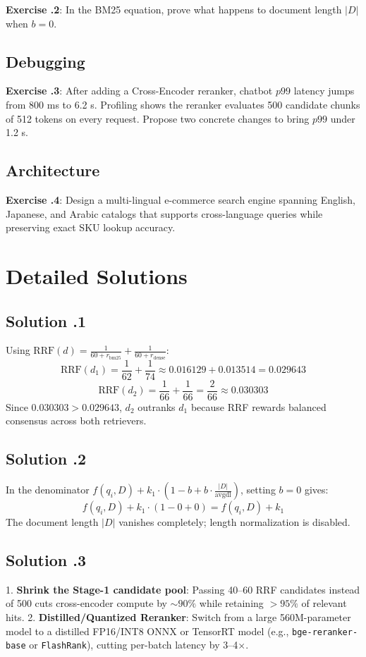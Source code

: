 \textbf{Exercise \thechapter.2}: In the BM25 equation, prove what happens to document length $|D|$ when $b = 0$.

\subsection*{Debugging}
\textbf{Exercise \thechapter.3}: After adding a Cross-Encoder reranker, chatbot $p99$ latency jumps from 800 ms to 6.2 s. Profiling shows the reranker evaluates 500 candidate chunks of 512 tokens on every request. Propose two concrete changes to bring $p99$ under 1.2 s.

\subsection*{Architecture}
\textbf{Exercise \thechapter.4}: Design a multi-lingual e-commerce search engine spanning English, Japanese, and Arabic catalogs that supports cross-language queries while preserving exact SKU lookup accuracy.

\section{Detailed Solutions}

\subsection*{Solution \thechapter.1}
Using $\text{RRF}(d) = \frac{1}{60 + r_{\text{bm25}}} + \frac{1}{60 + r_{\text{dense}}}$:
\[
\text{RRF}(d_1) = \frac{1}{62} + \frac{1}{74} \approx 0.016129 + 0.013514 = 0.029643
\]
\[
\text{RRF}(d_2) = \frac{1}{66} + \frac{1}{66} = \frac{2}{66} \approx 0.030303
\]
Since $0.030303 > 0.029643$, $d_2$ outranks $d_1$ because RRF rewards balanced consensus across both retrievers.

\subsection*{Solution \thechapter.2}
In the denominator $f(q_i, D) + k_1 \cdot \left(1 - b + b \cdot \frac{|D|}{\text{avgdl}}\right)$, setting $b = 0$ gives:
\[
f(q_i, D) + k_1 \cdot (1 - 0 + 0) = f(q_i, D) + k_1
\]
The document length $|D|$ vanishes completely; length normalization is disabled.

\subsection*{Solution \thechapter.3}
1. \textbf{Shrink the Stage-1 candidate pool}: Passing 40--60 RRF candidates instead of 500 cuts cross-encoder compute by $\sim 90\%$ while retaining $>95\%$ of relevant hits. 2. \textbf{Distilled/Quantized Reranker}: Switch from a large 560M-parameter model to a distilled FP16/INT8 ONNX or TensorRT model (e.g., \texttt{bge-reranker-base} or \texttt{FlashRank}), cutting per-batch latency by 3--4$\times$.

